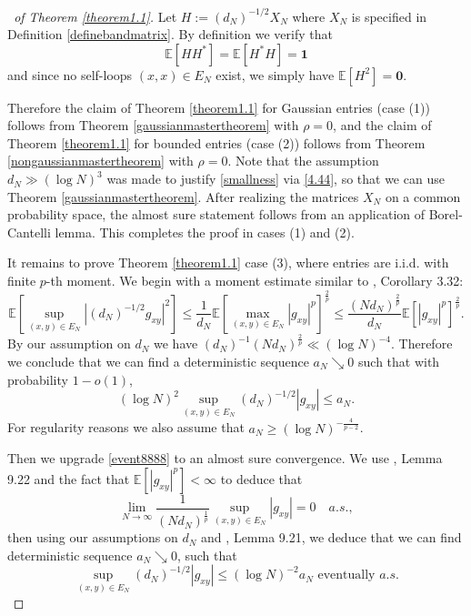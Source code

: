 \documentclass[11pt,reqno]{amsart}
\theoremstyle{plain}
\theoremstyle{remark}
\numberwithin{equation}{section}
\begin{document}
\begin{proof}[\proofname\ of Theorem \ref{theorem1.1}] Let $H:=(d_N)^{-1/2}X_N$ where $X_N$ is specified in Definition \ref{definebandmatrix}. By definition we verify that $$\mathbb{E}[HH^*]=\mathbb{E}[H^*H]=\mathbf{1}$$ and since no self-loops $(x,x)\in E_N$ exist, we simply have  $\mathbb{E}[H^2]=\mathbf{0}.$

    Therefore the claim of Theorem \ref{theorem1.1} for Gaussian entries (case (1)) follows from Theorem \ref{gaussianmastertheorem} with $\rho=0$, and the claim of Theorem \ref{theorem1.1} for bounded entries (case (2)) follows from Theorem \ref{nongaussianmastertheorem} with $\rho=0$. Note that the assumption $d_N\gg (\log N)^3$ was made to justify \eqref{smallness} via \eqref{4.44}, so that we can use Theorem \ref{gaussianmastertheorem}. After realizing the matrices $X_N$ on a common probability space, the almost sure statement follows from an application of Borel-Cantelli lemma. This completes the proof in cases (1) and (2).

It remains to prove Theorem \ref{theorem1.1}  case (3), where entries are i.i.d. with finite $p$-th moment. We begin with a moment estimate similar to \cite{brailovskaya2022universality}, Corollary 3.32: 
$$
\mathbb{E}\left[\sup_{(x,y)\in E_N}|(d_N)^{-1/2}g_{xy}|^2\right]\leq\frac{1}{d_N}\mathbb{E}\left[\max_{(x,y)\in E_N}|g_{xy}|^p\right]^\frac{2}{p}\leq\frac{(Nd_N)^\frac{2}{p}}{d_N}\mathbb{E}[|g_{xy}|^p]^\frac{2}{p}.
$$ By our assumption on $d_N$ we have $(d_N)^{-1}(Nd_N)^\frac{2}{p}\ll (\log N)^{-4}$. Therefore we conclude that we can find a deterministic sequence $a_N\searrow 0$ such that with probability $1-o(1)$,
\begin{equation}\label{event8888}(\log N)^2\sup_{(x,y)\in E_N}(d_N)^{-1/2}|g_{xy}|\leq  a_N.\end{equation} For regularity reasons we also assume that $a_N\geq (\log N)^{-\frac{4}{p-2}}$.

  Then we upgrade \eqref{event8888} to an almost sure convergence. We use \cite{brailovskaya2022universality}, Lemma 9.22 and the fact that $\mathbb{E}[|g_{xy}|^p]<\infty$ to deduce that 
   $$
\lim_{N\to\infty}\frac{1}{(Nd_N)^\frac{1}{p}}\sup_{(x,y)\in E_N}|g_{xy}|=0
   \quad a.s.,$$ then using our assumptions on $d_N$ and \cite{brailovskaya2022universality}, Lemma 9.21, we deduce that we can find deterministic sequence $a_N\searrow 0$, such that
   \begin{equation}\label{eventualalmostsure}
\sup_{(x,y)\in E_N}(d_N)^{-1/2}|g_{xy}|\leq (\log N)^{-2}a_N\text{ eventually } a.s.
   \end{equation} 


\end{proof}
\end{document}
